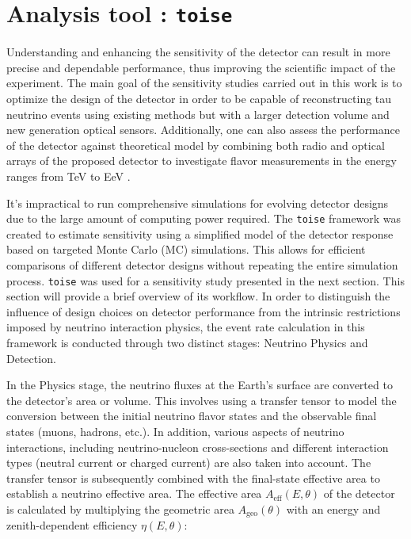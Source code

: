 \section{Analysis tool : \texttt{toise}}
\label{sec:toise}
Understanding and enhancing the sensitivity of the detector can result in more precise and dependable performance, thus improving the scientific impact of the experiment. The main goal of the sensitivity studies carried out in this work is to optimize the design of the detector in order to be capable of reconstructing tau neutrino events using existing methods but with a larger detection volume and new generation optical sensors. Additionally, one can also assess the performance of the detector against theoretical model  by combining both radio and optical arrays of the proposed detector to investigate flavor measurements in the energy ranges from TeV to EeV .

It's impractical to run comprehensive simulations for evolving detector designs due to the large amount of computing power required. The \texttt{toise}  framework was created to estimate sensitivity using a simplified model of the detector response based on targeted Monte Carlo (MC) simulations. This allows for efficient comparisons of different detector designs without repeating the entire simulation process. \texttt{toise} was used for a sensitivity study presented in the next section. This section will provide a brief overview of its workflow. In order to distinguish the influence of design choices on detector performance from the intrinsic restrictions imposed by neutrino interaction physics, the event rate calculation in this framework is conducted through two distinct stages: Neutrino Physics and Detection.

In the Physics stage, the neutrino fluxes at the Earth's surface are converted to the detector's area or volume. This involves using a transfer tensor to model the conversion between the initial neutrino flavor states and the observable final states (muons, hadrons, etc.). In addition, various aspects of neutrino interactions, including neutrino-nucleon cross-sections and different interaction types (neutral current or charged current) are also taken into account. The transfer tensor is subsequently combined with the final-state effective area to establish a neutrino effective area. The effective area \( A_{\text{eff}}(E, \theta) \) of the detector is calculated by multiplying the geometric area \( A_{\text{geo}}(\theta) \) with an energy and zenith-dependent efficiency \( \eta(E, \theta) \):

